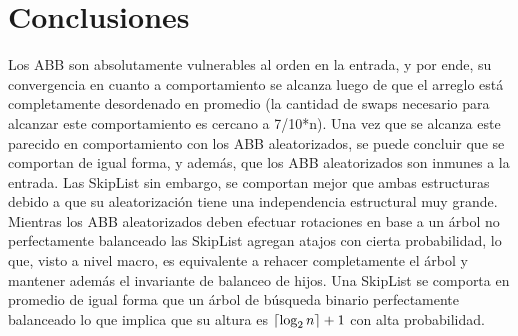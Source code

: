 \documentclass[12pt,letterpaper]{article}
\DeclarePairedDelimiter{\ceil}{\lceil}{\rceil}
\def \altura {\ceil{\log_2 n} +1}
\begin{document}
\section{Conclusiones}
Los ABB son absolutamente vulnerables al orden en la entrada, y por ende, su convergencia en cuanto a comportamiento se alcanza luego de que el arreglo está completamente desordenado en promedio (la cantidad de swaps necesario para alcanzar este comportamiento es cercano a 7/10*n). Una vez que se alcanza este parecido en comportamiento con los ABB aleatorizados, se puede concluir que se comportan de igual forma, y además, que los ABB aleatorizados son inmunes a la entrada. Las SkipList sin embargo, se comportan mejor que ambas estructuras debido a que su aleatorización tiene una independencia estructural muy grande. Mientras los ABB aleatorizados deben efectuar rotaciones en base a un árbol no perfectamente balanceado las SkipList agregan atajos con cierta probabilidad, lo que, visto a nivel macro, es equivalente a rehacer completamente el árbol y mantener además el invariante de balanceo de hijos. Una SkipList se comporta en promedio de igual forma que un árbol de búsqueda binario perfectamente balanceado lo que implica que su altura es $\altura$ con alta probabilidad.

\end{document}
